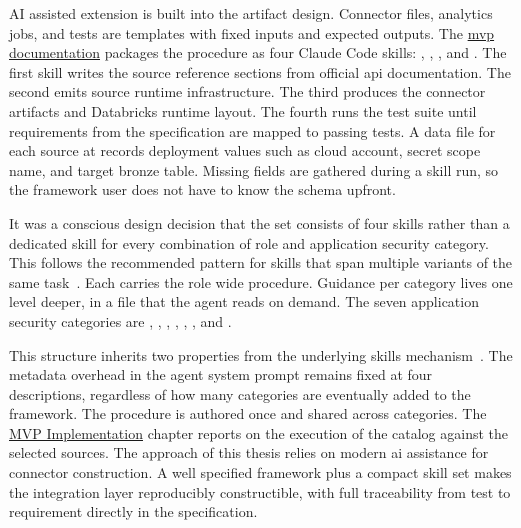 AI assisted extension is built into the artifact design. Connector files, analytics jobs, and tests are templates with fixed inputs and expected outputs. The \href{https://vkraus.github.io/appsec-mvp/}{\gls{mvp} documentation} packages the procedure as four Claude Code skills: , , , and . The first skill writes the source reference sections from official \gls{api} documentation. The second emits source runtime infrastructure. The third produces the connector artifacts and Databricks runtime layout. The fourth runs the test suite until requirements from the specification are mapped to passing tests. A data file for each source at  records deployment values such as cloud account, secret scope name, and target bronze table. Missing fields are gathered during a skill run, so the framework user does not have to know the schema upfront.

It was a conscious design decision that the set consists of four skills rather than a dedicated skill for every combination of role and application security category. This follows the recommended pattern for skills that span multiple variants of the same task~\parencite{Anthropic2026SkillsBestPractices}. Each  carries the role wide procedure. Guidance per category lives one level deeper, in a  file that the agent reads on demand. The seven application security categories are , , , , , , and .

This structure inherits two properties from the underlying skills mechanism~\parencite{Anthropic2025AgentSkills, AgentSkills2026Spec}. The metadata overhead in the agent system prompt remains fixed at four descriptions, regardless of how many categories are eventually added to the framework. The procedure is authored once and shared across categories. The \hyperref[ch:implementation]{MVP Implementation} chapter reports on the execution of the catalog against the selected sources. The approach of this thesis relies on modern \gls{ai} assistance for connector construction. A well specified framework plus a compact skill set makes the integration layer reproducibly constructible, with full traceability from test to requirement directly in the specification.
